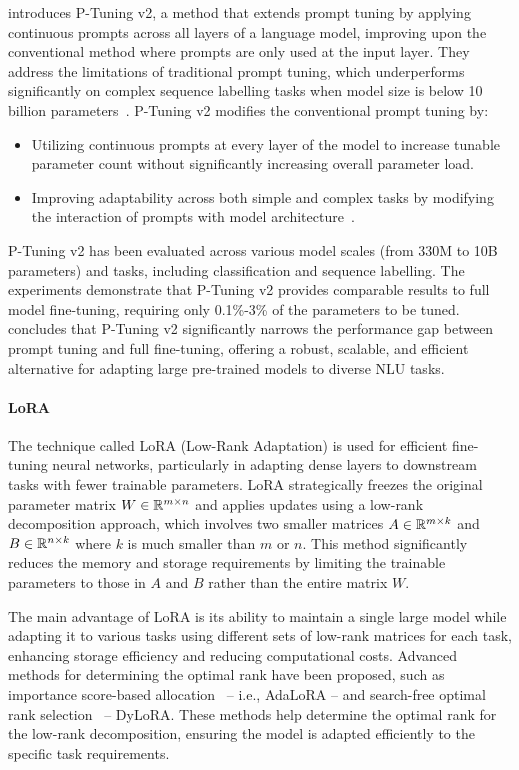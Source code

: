 \textcite{liu2022ptuning} introduces P-Tuning v2, a method that extends prompt tuning by applying continuous prompts across all layers of a language model, improving upon the conventional method where prompts are only used at the input layer.
They address the limitations of traditional prompt tuning, which underperforms significantly on complex sequence labelling tasks when model size is below 10 billion parameters~\cite{lester2021power}.
P-Tuning v2 modifies the conventional prompt tuning by:
\begin{itemize}
	\item Utilizing continuous prompts at every layer of the model to increase tunable parameter count without significantly increasing overall parameter load.
	\item Improving adaptability across both simple and complex tasks by modifying the interaction of prompts with model architecture~\cite{li2021prefixtuning, qin2021learning}.
\end{itemize}
P-Tuning v2 has been evaluated across various model scales (from 330M to 10B parameters) and tasks, including classification and sequence labelling.
The experiments demonstrate that P-Tuning v2 provides comparable results to full model fine-tuning, requiring only 0.1\%-3\% of the parameters to be tuned.
\textcite{liu2022ptuning} concludes that P-Tuning v2 significantly narrows the performance gap between prompt tuning and full fine-tuning, offering a robust, scalable, and efficient alternative for adapting large pre-trained models to diverse NLU tasks.

\paragraph{LoRA}
\label{subsubsec:lora}

The technique called LoRA (Low-Rank Adaptation) is used for efficient fine-tuning neural networks, particularly in adapting dense layers to downstream tasks with fewer trainable parameters.
LoRA strategically freezes the original parameter matrix $W \in \mathbb{R}^{m \times n}$ and applies updates using a low-rank decomposition approach, which involves two smaller matrices $A \in \mathbb{R}^{m \times k}$ and $B \in \mathbb{R}^{n \times k}$ where $k$ is much smaller than $m$ or $n$.
This method significantly reduces the memory and storage requirements by limiting the trainable parameters to those in $A$ and $B$ rather than the entire matrix $W$.

The main advantage of LoRA is its ability to maintain a single large model while adapting it to various tasks using different sets of low-rank matrices for each task, enhancing storage efficiency and reducing computational costs.
Advanced methods for determining the optimal rank have been proposed, such as importance score-based allocation~\cite{zhang2023adalora} -- i.e., AdaLoRA -- and search-free optimal rank selection~\cite{valipour2023dylora} -- DyLoRA\@.
These methods help determine the optimal rank for the low-rank decomposition, ensuring the model is adapted efficiently to the specific task requirements.

